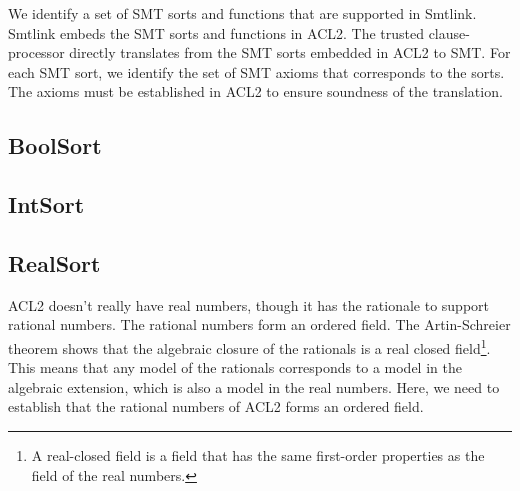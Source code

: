 We identify a set of SMT sorts and functions that are supported in Smtlink.
Smtlink embeds the SMT sorts and functions in ACL2. The trusted clause-processor
directly translates from the SMT sorts embedded in ACL2 to SMT.
For each SMT sort, we identify the set of SMT axioms that corresponds to the
sorts. The axioms must be established in ACL2 to ensure soundness of the
translation.

\subsection{BoolSort}

\subsection{IntSort}
\subsection{RealSort}
ACL2 doesn't really have real numbers, though it has the rationale to support
rational numbers. The rational numbers form an ordered field. The Artin-Schreier
theorem shows that the algebraic closure of the rationals is a real closed
field\footnote{A real-closed field is a field that has the same first-order
  properties as the field of the real numbers.}. This means that any model of
the rationals corresponds to a model in the algebraic extension, which is also a
model in the real numbers.  Here, we need to establish that
the rational numbers of ACL2 forms an ordered field.





